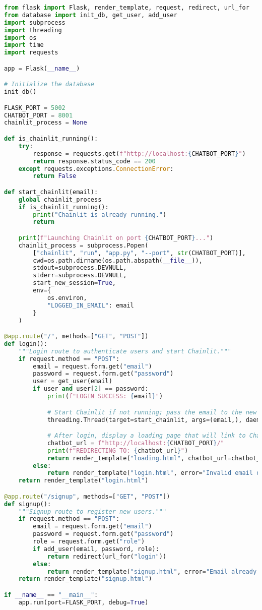 \begin{lstlisting}[language=Python, caption={User authentication and role assignment code}, basicstyle=\small\ttfamily]
from flask import Flask, render_template, request, redirect, url_for
from database import init_db, get_user, add_user
import subprocess
import threading
import os
import time
import requests

app = Flask(__name__)

# Initialize the database
init_db()

FLASK_PORT = 5002
CHATBOT_PORT = 8001
chainlit_process = None

def is_chainlit_running():
    try:
        response = requests.get(f"http://localhost:{CHATBOT_PORT}")
        return response.status_code == 200
    except requests.exceptions.ConnectionError:
        return False

def start_chainlit(email):
    global chainlit_process
    if is_chainlit_running():
        print("Chainlit is already running.")
        return

    print(f"Launching Chainlit on port {CHATBOT_PORT}...")
    chainlit_process = subprocess.Popen(
        ["chainlit", "run", "app.py", "--port", str(CHATBOT_PORT)],
        cwd=os.path.dirname(os.path.abspath(__file__)),
        stdout=subprocess.DEVNULL,
        stderr=subprocess.DEVNULL,
        start_new_session=True,
        env={
            os.environ,
            "LOGGED_IN_EMAIL": email
        }
    )

@app.route("/", methods=["GET", "POST"])
def login():
    """Login route to authenticate users and start Chainlit."""
    if request.method == "POST":
        email = request.form.get("email")
        password = request.form.get("password")
        user = get_user(email)
        if user and user[2] == password:
            print(f"LOGIN SUCCESS: {email}")

            # Start Chainlit if not running; pass the email to the new process
            threading.Thread(target=start_chainlit, args=(email,), daemon=True).start()

            # After login, display a loading page that will link to Chainlit
            chatbot_url = f"http://localhost:{CHATBOT_PORT}/"
            print(f"REDIRECTING TO: {chatbot_url}")
            return render_template("loading.html", chatbot_url=chatbot_url)
        else:
            return render_template("login.html", error="Invalid email or password.")
    return render_template("login.html")

@app.route("/signup", methods=["GET", "POST"])
def signup():
    """Signup route to register new users."""
    if request.method == "POST":
        email = request.form.get("email")
        password = request.form.get("password")
        role = request.form.get("role")
        if add_user(email, password, role):
            return redirect(url_for("login"))
        else:
            return render_template("signup.html", error="Email already registered.")
    return render_template("signup.html")

if __name__ == "__main__":
    app.run(port=FLASK_PORT, debug=True)
\end{lstlisting}

